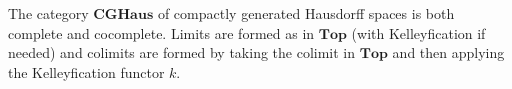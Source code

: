 The category $\mathbf{CGHaus}$ of compactly generated Hausdorff spaces is both complete and cocomplete. Limits are formed as in $\mathbf{Top}$ (with Kelleyfication if needed) and colimits are formed by taking the colimit in $\mathbf{Top}$ and then applying the Kelleyfication functor $k$.
